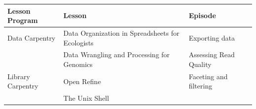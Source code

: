 \documentclass[
]{book}
\begin{document}
\begin{longtable}[]{@{}lll@{}}
\toprule
\begin{minipage}[b]{0.47\columnwidth}\raggedright
Lesson Program\strut
\end{minipage} & \begin{minipage}[b]{0.20\columnwidth}\raggedright
Lesson\strut
\end{minipage} & \begin{minipage}[b]{0.24\columnwidth}\raggedright
Episode\strut
\end{minipage}\tabularnewline
\midrule
\endhead
\begin{minipage}[t]{0.47\columnwidth}\raggedright
Data Carpentry\strut
\end{minipage} & \begin{minipage}[t]{0.20\columnwidth}\raggedright
Data Organization in Spreadsheets for Ecologists\strut
\end{minipage} & \begin{minipage}[t]{0.24\columnwidth}\raggedright
Exporting data\strut
\end{minipage}\tabularnewline
\begin{minipage}[t]{0.47\columnwidth}\raggedright
\strut
\end{minipage} & \begin{minipage}[t]{0.20\columnwidth}\raggedright
Data Wrangling and Processing for Genomics\strut
\end{minipage} & \begin{minipage}[t]{0.24\columnwidth}\raggedright
Assessing Read Quality\strut
\end{minipage}\tabularnewline
\begin{minipage}[t]{0.47\columnwidth}\raggedright
Library Carpentry\strut
\end{minipage} & \begin{minipage}[t]{0.20\columnwidth}\raggedright
Open Refine\strut
\end{minipage} & \begin{minipage}[t]{0.24\columnwidth}\raggedright
Faceting and filtering\strut
\end{minipage}\tabularnewline
\begin{minipage}[t]{0.47\columnwidth}\raggedright
\strut
\end{minipage} & \begin{minipage}[t]{0.20\columnwidth}\raggedright
The Unix Shell\strut
\end{minipage} & \begin{minipage}[t]{0.24\columnwidth}\raggedright

\end{minipage}
\end{longtable}
\end{document}
